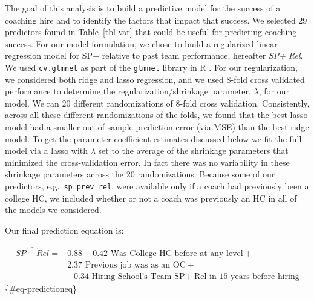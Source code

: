 \documentclass[
  12pt]{article}
\begin{document}
The goal of this analysis is to build a predictive model for the success
of a coaching hire and to identify the factors that impact that success.
We selected 29 predictors found in Table~\ref{tbl-var} that could be
useful for predicting coaching success. For our model formulation, we
chose to build a regularized linear regression model for SP+ relative to
past team performance, hereafter \emph{SP+ Rel}. We used
\texttt{cv.glmnet} as part of the \texttt{glmnet} library in R
\citep{glmnet}. For our regularization, we considered both ridge and
lasso regression, and we used 8-fold cross validated performance to
determine the regularization/shrinkage parameter, \(\lambda\), for our
model. We ran 20 different randomizations of 8-fold cross validation.
Consistently, across all these different randomizations of the folds, we
found that the best lasso model had a smaller out of sample prediction
error (via MSE) than the best ridge model. To get the parameter
coefficient estimates discussed below we fit the full model via a lasso
with \(\lambda\) set to the average of the shrinkage parameters that
minimized the cross-validation error. In fact there was no variability
in these shrinkage parameters across the 20 randomizations. Because some
of our predictors, e.g.~\texttt{sp\_prev\_rel}, were available only if a
coach had previously been a college HC, we included whether or not a
coach was previously an HC in all of the models we considered.

Our final prediction equation is:

\begin{align}
\widehat{SP+ Rel} =& 0.88 -0.42 \text{ Was College HC before at any level} + \\
&2.37 \text{ Previous job was as an OC} + \\
&-0.34 \text{ Hiring School's Team SP+ Rel in 15 years before hiring} \nonumber
\end{align} \{\#eq-predictioneq\}
\end{document}
